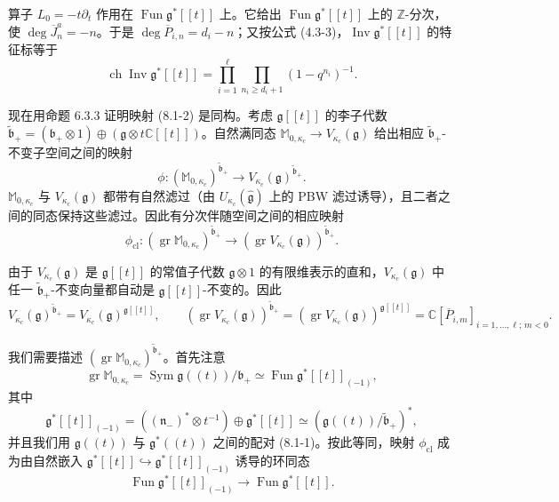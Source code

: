 算子 $L_0=-t\partial_t$ 作用在 $\operatorname{Fun}\mathfrak g^*[\![t]\!]$ 上。它给出 $\operatorname{Fun}\mathfrak g^*[\![t]\!]$ 上的 $\mathbb Z$-分次，使 $\deg\overline J^a_n=-n$。于是 $\deg\overline P_{i,n}=d_i-n$；又按公式 (4.3-3)，$\operatorname{Inv}\mathfrak g^*[\![t]\!]$ 的特征标等于
\begin{equation}
    \operatorname{ch}\operatorname{Inv}\mathfrak g^*[\![t]\!]=\prod_{i=1}^{\ell}\prod_{n_i\ge d_i+1}(1-q^{n_i})^{-1}.
    \tag{8.1-3}
\end{equation}


现在用命题 6.3.3 证明映射 (8.1-2) 是同构。考虑 $\mathfrak g[\![t]\!]$ 的李子代数 $\tilde{\mathfrak b}_+=(\mathfrak b_+\otimes1)\oplus(\mathfrak g\otimes t\mathbb C[[t]])$。自然满同态 $\mathbb M_{0,\kappa_c}\to V_{\kappa_c}(\mathfrak g)$ 给出相应 $\tilde{\mathfrak b}_+$-不变子空间之间的映射
\[
    \phi:(\mathbb M_{0,\kappa_c})^{\tilde{\mathfrak b}_+}\longrightarrow V_{\kappa_c}(\mathfrak g)^{\tilde{\mathfrak b}_+}.
\]
$\mathbb M_{0,\kappa_c}$ 与 $V_{\kappa_c}(\mathfrak g)$ 都带有自然滤过（由 $U_{\kappa_c}(\hat{\mathfrak g})$ 上的 PBW 滤过诱导），且二者之间的同态保持这些滤过。因此有分次伴随空间之间的相应映射
\[
    \phi_{\mathrm{cl}}:(\operatorname{gr}\mathbb M_{0,\kappa_c})^{\tilde{\mathfrak b}_+}\longrightarrow(\operatorname{gr}V_{\kappa_c}(\mathfrak g))^{\tilde{\mathfrak b}_+}.
\]

由于 $V_{\kappa_c}(\mathfrak g)$ 是 $\mathfrak g[\![t]\!]$ 的常值子代数 $\mathfrak g\otimes1$ 的有限维表示的直和，$V_{\kappa_c}(\mathfrak g)$ 中任一 $\tilde{\mathfrak b}_+$-不变向量都自动是 $\mathfrak g[\![t]\!]$-不变的。因此
\[
    V_{\kappa_c}(\mathfrak g)^{\tilde{\mathfrak b}_+}=V_{\kappa_c}(\mathfrak g)^{\mathfrak g[\![t]\!]},\qquad
    (\operatorname{gr}V_{\kappa_c}(\mathfrak g))^{\tilde{\mathfrak b}_+}=(\operatorname{gr}V_{\kappa_c}(\mathfrak g))^{\mathfrak g[\![t]\!]}=\mathbb C[\overline P_{i,m}]_{i=1,\dots,\ell;\,m<0}.
\]

我们需要描述 $(\operatorname{gr}\mathbb M_{0,\kappa_c})^{\tilde{\mathfrak b}_+}$。首先注意
\[
    \operatorname{gr}\mathbb M_{0,\kappa_c}=\operatorname{Sym}\mathfrak g((t))/\mathfrak b_+\simeq\operatorname{Fun}\mathfrak g^*[\![t]\!]_{(-1)},
\]
其中
\[
    \mathfrak g^*[\![t]\!]_{(-1)}=((\mathfrak n_-)^*\otimes t^{-1})\oplus\mathfrak g^*[\![t]\!]\simeq(\mathfrak g((t))/\tilde{\mathfrak b}_+)^*,
\]
并且我们用 $\mathfrak g((t))$ 与 $\mathfrak g^*((t))$ 之间的配对 (8.1-1)。按此等同，映射 $\phi_{\mathrm{cl}}$ 成为由自然嵌入 $\mathfrak g^*[\![t]\!]\hookrightarrow\mathfrak g^*[\![t]\!]_{(-1)}$ 诱导的环同态
\[
    \operatorname{Fun}\mathfrak g^*[\![t]\!]_{(-1)}\longrightarrow\operatorname{Fun}\mathfrak g^*[\![t]\!].
\]

